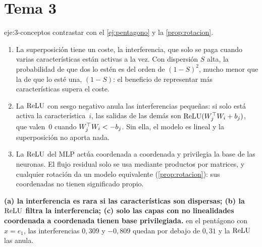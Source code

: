 \section{Tema 3}

\begin{solucion}{eje:3-conceptos}
\planteamiento contrastar con el \cref{ej:pentagono} y la \cref{prop:rotacion}.
\pasos
\begin{enumerate}[label=(\alph*)]
  \item La superposición tiene un coste, la interferencia, que solo se paga cuando varias características están activas a la vez. Con dispersión $S$ alta, la probabilidad de que dos lo estén es del orden de $(1-S)^{2}$, mucho menor que la de que lo esté una, $(1-S)$: el beneficio de representar más características supera el coste.
  \item La $\operatorname{ReLU}$ con sesgo negativo anula las interferencias pequeñas: si solo está activa la característica~$i$, las salidas de las demás son $\operatorname{ReLU}(W_j^{\top} W_i+b_j)$, que valen~0 cuando $W_j^{\top} W_i<-b_j$. Sin ella, el modelo es lineal y la superposición no aporta nada.
  \item La $\operatorname{ReLU}$ del MLP actúa coordenada a coordenada y privilegia la base de las neuronas. El flujo residual solo se usa mediante productos por matrices, y cualquier rotación da un modelo equivalente (\cref{prop:rotacion}): sus coordenadas no tienen significado propio.
\end{enumerate}
\resultado \textbf{(a) la interferencia es rara si las características son dispersas; (b) la $\operatorname{ReLU}$ filtra la interferencia; (c) solo las capas con no linealidades coordenada a coordenada tienen base privilegiada.}
\comprobacion en el pentágono con $x=e_1$, las interferencias $0{,}309$ y $-0{,}809$ quedan por debajo de $0{,}31$ y la $\operatorname{ReLU}$ las anula.
\end{solucion}

